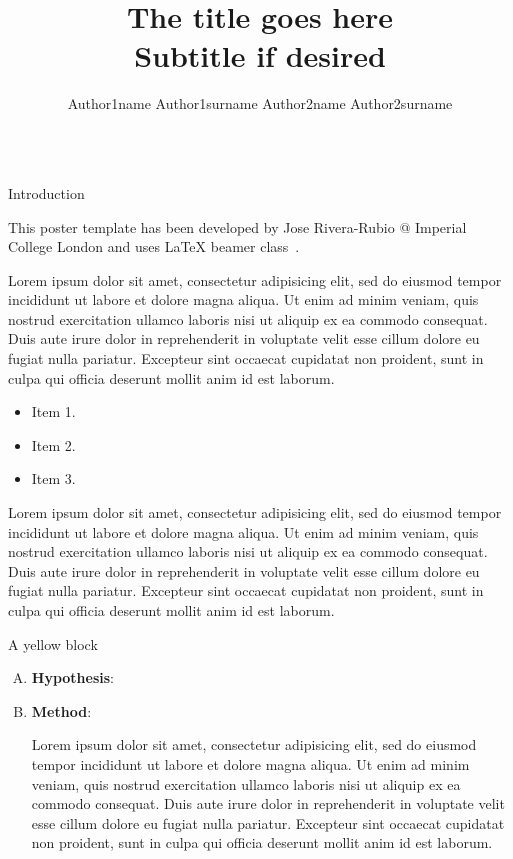 \documentclass[final]{beamer}
\title[Title]{\VeryHuge The title goes here \\ \LARGE Subtitle if desired}
\author[Author1Surname \& Author2Surname]{Author1name Author1surname Author2name Author2surname}
\institute[Imperial College London]{Research Group, Imperial College London}
\date{\date}
\begin{document}
\begin{frame}{} 
\begin{columns}[t]

\begin{column}{.3\linewidth}
    
\begin{block}{Introduction}

	This poster template has been developed by Jose Rivera-Rubio @ Imperial College London and uses LaTeX beamer class~\cite{Tantau2004}.
	
	Lorem ipsum dolor sit amet, consectetur adipisicing elit, sed do eiusmod tempor incididunt ut labore et dolore magna aliqua. Ut enim ad minim veniam, quis nostrud exercitation ullamco laboris nisi ut aliquip ex ea commodo consequat. Duis aute irure dolor in reprehenderit in voluptate velit esse cillum dolore eu fugiat nulla pariatur. Excepteur sint occaecat cupidatat non proident, sunt in culpa qui officia deserunt mollit anim id est laborum.
	\begin{itemize}
	\item Item 1.
	\item Item 2.
	\item Item 3.
	\end{itemize}	
	\alert{Lorem ipsum} dolor sit amet, consectetur adipisicing elit, sed do eiusmod tempor incididunt ut labore et dolore magna aliqua. Ut enim ad minim veniam, quis nostrud exercitation ullamco laboris nisi ut aliquip ex ea commodo consequat. Duis aute irure dolor in reprehenderit in voluptate velit esse cillum dolore eu fugiat nulla pariatur. Excepteur sint occaecat cupidatat non proident, sunt in culpa qui officia deserunt mollit anim id est laborum.

\end{block}

\begin{problockYellow}{A yellow block}

\begin{enumerate}[A.]

\item \textbf{Hypothesis}: 

\item \textbf{Method}: 



Lorem ipsum dolor sit amet, consectetur adipisicing elit, sed do eiusmod tempor incididunt ut labore et dolore magna aliqua. Ut enim ad minim veniam, quis nostrud exercitation ullamco laboris nisi ut aliquip ex ea commodo consequat. Duis aute irure dolor in reprehenderit in voluptate velit esse cillum dolore eu fugiat nulla pariatur. Excepteur sint occaecat cupidatat non proident, sunt in culpa qui officia deserunt mollit anim id est laborum.



\end{enumerate}
\end{problockYellow}
\end{column}
\end{columns}
\end{frame}
\end{document}
